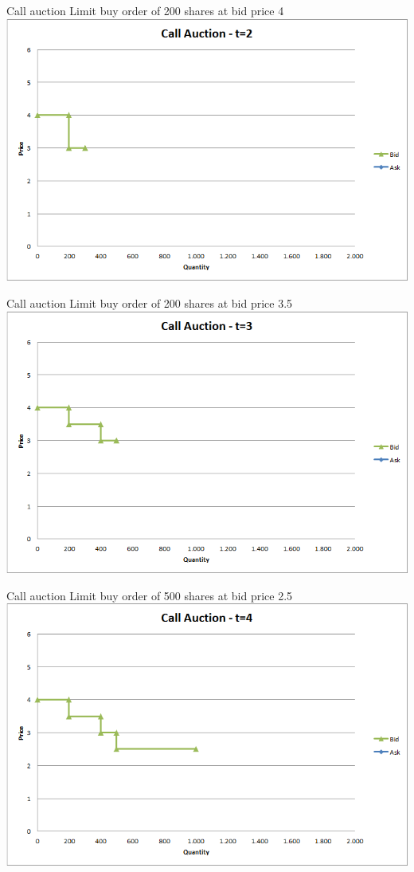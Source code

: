 \begin{frame}{Call auction}
	Limit buy order of 200 shares at bid price 4
	\quad
	\center
	\includegraphics[width=.75\linewidth]{pics/Call_t2}
\end{frame}


\begin{frame}{Call auction}
	Limit buy order of 200 shares at bid price 3.5
	\quad
	\center
	\includegraphics[width=.75\linewidth]{pics/Call_t3}
\end{frame}


\begin{frame}{Call auction}
	Limit buy order of 500 shares at bid price 2.5
	\quad
	\center
	\includegraphics[width=.75\linewidth]{pics/Call_t4}
\end{frame}


